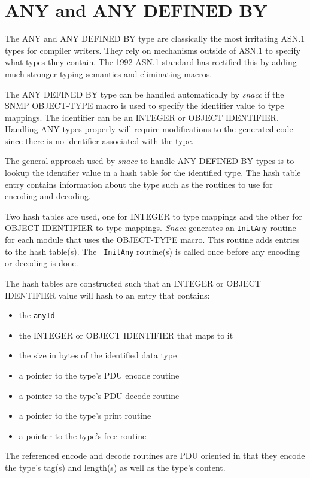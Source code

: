 \section{\label{any-C-section}ANY and ANY DEFINED BY}


The ANY and ANY DEFINED BY type are classically the most irritating
ASN.1 types for compiler writers.  They rely on mechanisms outside of
ASN.1 to specify what types they contain.  The 1992 ASN.1 standard has
rectified this by adding much stronger typing semantics and eliminating
macros.

The ANY DEFINED BY type can be handled automatically by {\em snacc} if
the SNMP OBJECT-TYPE \cite{snmp} macro is used to specify the
identifier value to type mappings.  The identifier can be an INTEGER
or OBJECT IDENTIFIER\@.  Handling ANY types properly will require
modifications to the generated code since there is no identifier
associated with the type.

The general approach used by {\em snacc} to handle ANY DEFINED BY
types is to lookup the identifier value in a hash table for the
identified type.  The hash table entry contains information about the
type such as the routines to use for encoding and decoding.

Two hash tables are used, one for INTEGER to type mappings and the
other for OBJECT IDENTIFIER to type mappings.  {\em Snacc} generates
an {\tt InitAny} routine for each module that uses the OBJECT-TYPE
macro.  This routine adds entries to the hash table(s).  The {\tt
InitAny} routine(s) is called once before any encoding or decoding is
done.


The hash tables are constructed such that an INTEGER or OBJECT
IDENTIFIER value will hash to an entry that contains:
\begin{itemize}
\item {the {\tt anyId}}
\item {the INTEGER or OBJECT IDENTIFIER that maps to it}
\item {the size in bytes of the identified data type}
\item {a pointer to the type's PDU encode routine}
\item {a pointer to the type's PDU decode routine}
\item {a pointer to the type's print routine}
\item {a pointer to the type's free routine}
\end{itemize}
The referenced encode and decode routines are PDU oriented in that
they encode the type's tag(s) and length(s) as well as the type's
content.

